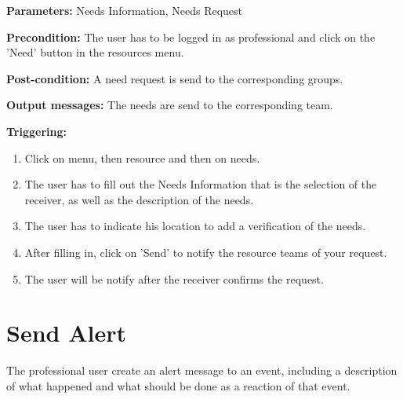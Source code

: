 \begin{description}

\item \textbf{Parameters:} Needs Information, Needs Request
\item \textbf{Precondition:} The user has to be logged in as professional and
click on the 'Need' button in the resources menu.
\item \textbf{Post-condition:}  A need request is send to the corresponding groups.
\item \textbf{Output messages:} The needs are send to the corresponding team.

\item \textbf{Triggering:}
\begin{enumerate}
\item Click on menu, then resource and then on needs.
\item The user has to fill out the Needs Information that is the selection of
the receiver, as well as the description of the needs.
\item The user has to indicate his location to add a verification of the needs. 
\item After filling in, click on 'Send' to notify the resource teams of your
request.
\item The user will be notify after the receiver confirms the request. 
\end{enumerate}
\end{description}

\section{Send Alert}
\label{operation:Send Alert}
The professional user create an alert message to an event, including a
description of what happened and what should be done as a reaction of that event. \\

